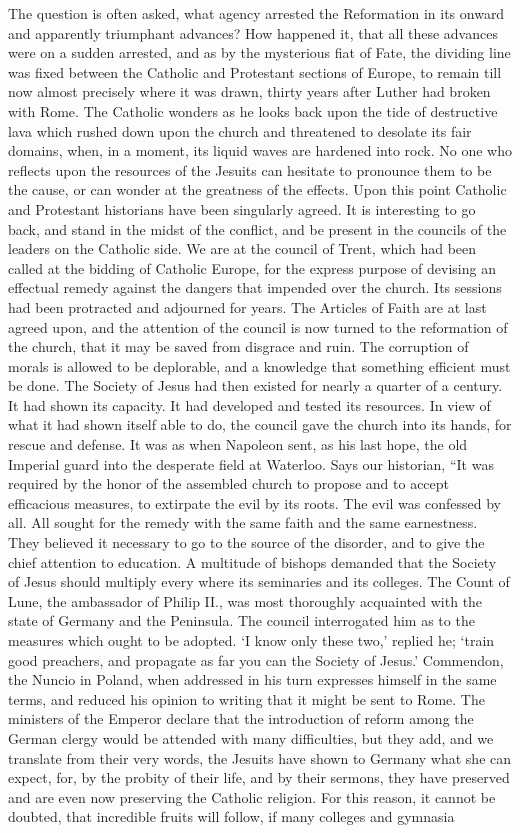 \documentclass[]{book}
\begin{document}
The question is often asked, what agency arrested the Reformation in its onward and apparently triumphant advances? How happened it, that all these advances were on a sudden arrested, and as by the mysterious fiat of Fate, the dividing line was fixed between the Catholic and Protestant sections of Europe, to remain till now almost precisely where it was drawn, thirty years after Luther had broken with Rome. The Catholic wonders as he looks back upon the tide of destructive lava which rushed down upon the church and threatened to desolate its fair domains, when, in a moment, its liquid waves are hardened into rock. No one who reflects upon the resources of the Jesuits can hesitate to pronounce them to be the cause, or can wonder at the greatness of the effects. Upon this point Catholic and Protestant historians have been singularly agreed. It is interesting to go back, and stand in the midst of the conflict, and be present in the councils of the leaders on the Catholic side. We are at the council of Trent, which had been called at the bidding of Catholic Europe, for the express purpose of devising an effectual remedy against the dangers that impended over the church. Its sessions had been protracted and adjourned for years. The Articles of Faith are at last agreed upon, and the attention of the council is now turned to the reformation of the church, that it may be saved from disgrace and ruin. The corruption of morals is allowed to be deplorable, and a knowledge that something efficient must be done. The Society of Jesus had then existed for nearly a quarter of a century. It had shown its capacity. It had developed and tested its resources. In view of what it had shown itself able to do, the council gave the church into its hands, for rescue and defense. It was as when Napoleon sent, as his last hope, the old Imperial guard into the desperate field at Waterloo. Says our historian, ``It was required by the honor of the assembled church to propose and to accept efficacious measures, to extirpate the evil by its roots. The evil was confessed by all. All sought for the remedy with the same faith and the same earnestness. They believed it necessary to go to the source of the disorder, and to give the chief attention to education. A multitude of bishops demanded that the Society of Jesus should multiply every where its seminaries and its colleges. The Count of Lune, the ambassador of Philip II., was most thoroughly acquainted with the state of Germany and the Peninsula. The council interrogated him as to the measures which ought to be adopted. `I know only these two,' replied he; `train good preachers, and propagate as far you can the Society of Jesus.' Commendon, the Nuncio in Poland, when addressed in his turn expresses himself in the same terms, and reduced his opinion to writing that it might be sent to Rome. The ministers of the Emperor declare that the introduction of reform among the German clergy would be attended with many difficulties, but they add, and we translate from their very words, the Jesuits have shown to Germany what she can expect, for, by the probity of their life, and by their sermons, they have preserved and are even now preserving the Catholic religion. For this reason, it cannot be doubted, that incredible fruits will follow, if many colleges and gymnasia 
\end{document}
